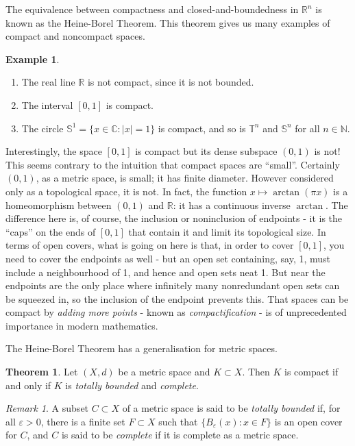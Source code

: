\documentclass{book}
\theoremstyle{definition}
\newtheorem{theorem}{Theorem}[section]
\newtheorem{example}{Example}[section]
\theoremstyle{remark}
\newtheorem{remark}{Remark}[section]
\newcommand{\R}{\mathbb{R}}
\newcommand{\C}{\mathbb{C}}
\newcommand{\N}{\mathbb{N}}
\newcommand{\T}{\mathbb{T}}
\begin{document}
The equivalence between compactness and closed-and-boundedness in $\R^n$ is known as the Heine-Borel Theorem. This theorem gives us many examples of compact and noncompact spaces.

\begin{example}~
\begin{enumerate}
    \item The real line $\R$ is not compact, since it is not bounded.
    \item The interval $[0,1]$ is compact.
    \item The circle $\mathbb S^1=\{x\in\C:|x|=1\}$ is compact, and so is $\T^n$ and $\mathbb S^n$ for all $n\in\N$.
\end{enumerate}
\end{example}

Interestingly, the space $[0,1]$ is compact but its dense subspace $(0,1)$ is not! This seems contrary to the intuition that compact spaces are ``small''. Certainly $(0,1)$, as a metric space, is small; it has finite diameter. However considered only as a topological space, it is not. In fact, the function $x\mapsto \arctan(\pi x)$ is a homeomorphism between $(0,1)$ and $\R$: it has a continuous inverse $\arctan$. The difference here is, of course, the inclusion or noninclusion of endpoints - it is the ``caps'' on the ends of $[0,1]$ that contain it and limit its topological size. In terms of open covers, what is going on here is that, in order to cover $[0,1]$, you need to cover the endpoints as well - but an open set containing, say, 1, must include a neighbourhood of 1, and hence and open sets neat 1. But near the endpoints are the only place where infinitely many nonredundant open sets can be squeezed in, so the inclusion of the endpoint prevents this. That spaces can be compact by \textit{adding more points} - known as \textit{compactification} - is of unprecedented importance in modern mathematics.

The Heine-Borel Theorem has a generalisation for metric spaces.

\begin{theorem}
\label{compactmetric}
Let $(X,d)$ be a metric space and $K\subset X$. Then $K$ is compact if and only if $K$ is \textit{totally bounded} and \textit{complete}.
\end{theorem}
\begin{remark}
A subset $C\subset X$ of a metric space is said to be \textit{totally bounded} if, for all $\varepsilon>0$, there is a finite set $F\subset X$ such that $\{B_{\varepsilon}(x):x\in F\}$ is an open cover for $C$, and $C$ is said to be \textit{complete} if it is complete as a metric space.
\end{remark}
\end{document}
